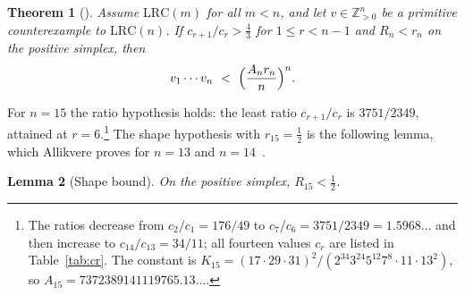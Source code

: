 \documentclass[11pt]{amsart}
\newtheorem{theorem}{Theorem}
\newtheorem{lemma}[theorem]{Lemma}
\theoremstyle{definition}
\theoremstyle{remark}
\newcommand{\Z}{\mathbb{Z}}
\newcommand{\LRC}{\mathrm{LRC}}
\begin{document}
\begin{theorem}[{\cite[Theorem~3.8]{All26}}]\label{thm:flag}
Assume $\LRC(m)$ for all $m<n$, and let $v\in\Z_{>0}^n$ be a primitive
counterexample to $\LRC(n)$. If $c_{r+1}/c_r>\frac43$ for $1\le r<n-1$ and
$R_n<r_n$ on the positive simplex, then
\[
 v_1\cdots v_n\ <\ \Bigl(\frac{A_nr_n}n\Bigr)^n .
\]
\end{theorem}

For $n=15$ the ratio hypothesis holds: the least ratio $c_{r+1}/c_r$ is
$3751/2349$, attained at $r=6$.\footnote{The ratios decrease from
$c_2/c_1=176/49$ to $c_7/c_6=3751/2349=1.5968\ldots$ and then increase to
$c_{14}/c_{13}=34/11$; all fourteen values $c_r$ are listed in
Table~\ref{tab:cr}. The constant is
$K_{15}=(17\cdot29\cdot31)^2/(2^{34}3^{24}5^{12}7^8\cdot11\cdot13^2)$, so
$A_{15}=7372389141119765.13\ldots$.} The shape hypothesis with
$r_{15}=\frac12$ is the following lemma, which Allikvere proves for $n=13$
and $n=14$~\cite[Lemma~3.7]{All26}.

\begin{lemma}[Shape bound]\label{lem:shape}
On the positive simplex, $R_{15}<\frac12$.
\end{lemma}
\end{document}
